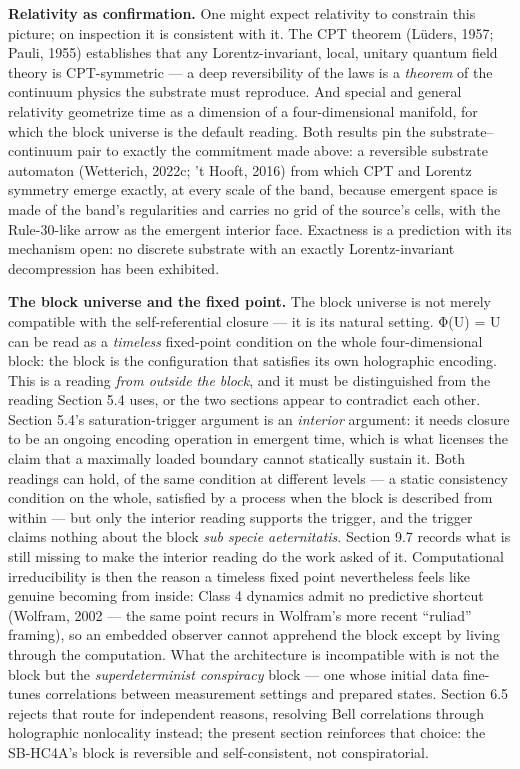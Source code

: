 \documentclass[
]{article}
\begin{document}
\textbf{Relativity as confirmation.} One might expect relativity to
constrain this picture; on inspection it is consistent with it. The CPT
theorem (Lüders, 1957; Pauli, 1955) establishes that any
Lorentz-invariant, local, unitary quantum field theory is CPT-symmetric
--- a deep reversibility of the laws is a \emph{theorem} of the
continuum physics the substrate must reproduce. And special and general
relativity geometrize time as a dimension of a four-dimensional
manifold, for which the block universe is the default reading. Both
results pin the substrate--continuum pair to exactly the commitment made
above: a reversible substrate automaton (Wetterich, 2022c; 't Hooft,
2016) from which CPT and Lorentz symmetry emerge exactly, at every scale
of the band, because emergent space is made of the band's regularities
and carries no grid of the source's cells, with the Rule-30-like arrow
as the emergent interior face. Exactness is a prediction with its
mechanism open: no discrete substrate with an exactly Lorentz-invariant
decompression has been exhibited.

\textbf{The block universe and the fixed point.} The block universe is
not merely compatible with the self-referential closure --- it is its
natural setting. Φ(U) = U can be read as a \emph{timeless} fixed-point
condition on the whole four-dimensional block: the block is the
configuration that satisfies its own holographic encoding. This is a
reading \emph{from outside the block}, and it must be distinguished from
the reading Section 5.4 uses, or the two sections appear to contradict
each other. Section 5.4's saturation-trigger argument is an
\emph{interior} argument: it needs closure to be an ongoing encoding
operation in emergent time, which is what licenses the claim that a
maximally loaded boundary cannot statically sustain it. Both readings
can hold, of the same condition at different levels --- a static
consistency condition on the whole, satisfied by a process when the
block is described from within --- but only the interior reading
supports the trigger, and the trigger claims nothing about the block
\emph{sub specie aeternitatis}. Section 9.7 records what is still
missing to make the interior reading do the work asked of it.
Computational irreducibility is then the reason a timeless fixed point
nevertheless feels like genuine becoming from inside: Class 4 dynamics
admit no predictive shortcut (Wolfram, 2002 --- the same point recurs in
Wolfram's more recent ``ruliad'' framing), so an embedded observer
cannot apprehend the block except by living through the computation.
What the architecture is incompatible with is not the block but the
\emph{superdeterminist conspiracy} block --- one whose initial data
fine-tunes correlations between measurement settings and prepared
states. Section 6.5 rejects that route for independent reasons,
resolving Bell correlations through holographic nonlocality instead; the
present section reinforces that choice: the SB-HC4A's block is
reversible and self-consistent, not conspiratorial.
\end{document}
